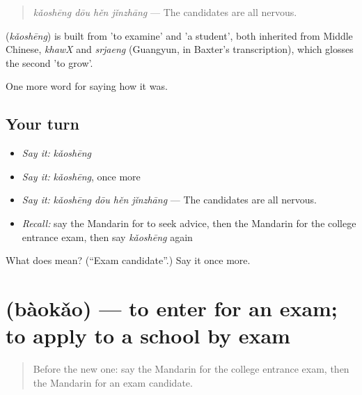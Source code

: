 \begin{quote}
\emph{kǎoshēng dōu hěn jǐnzhāng} — The candidates are all nervous.
\end{quote}

\begin{cousinweb}
\textbf{} (\emph{kǎoshēng}) is built from  'to examine' and  'a student', both inherited from Middle Chinese, \emph{khawX} and \emph{srjaeng} (Guangyun, in Baxter's transcription), which glosses the second 'to grow'.
\end{cousinweb}

\begin{grammarlens}[title={What you've built}]
One more word for saying how it was.
\end{grammarlens}

\subsection*{Your turn}
\begin{itemize}
\raggedright
  \item \emph{Say it:} \emph{kǎoshēng}
  \item \emph{Say it:} \emph{kǎoshēng}, once more
  \item \emph{Say it:} \emph{kǎoshēng dōu hěn jǐnzhāng} — The candidates are all nervous.
  \item \emph{Recall:} say the Mandarin for to seek advice, then the Mandarin for the college entrance exam, then say \emph{kǎoshēng} again
\end{itemize}

\begin{tcolorbox}[breakable,colback=teal!4,colframe=teal!35!black,title={Before you move on}]
What does  mean? (\textquotedblleft{}Exam candidate\textquotedblright{}.) Say it once more.
\end{tcolorbox}
\section[\texorpdfstring{\zh{报考} (bàokǎo)}{报考 (bàokǎo)}]{ (bàokǎo) — to enter for an exam; to apply to a school by exam}

\label{lesson:ZH-C494-baokao}



\begin{quote}
Before the new one: say the Mandarin for the college entrance exam, then the Mandarin for an exam candidate.
\end{quote}

